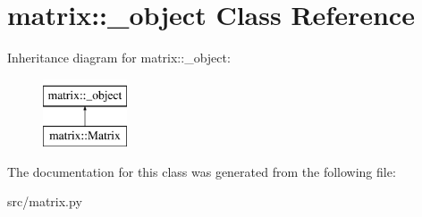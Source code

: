 \hypertarget{classmatrix_1_1__object}{
\section{matrix::\_\-object Class Reference}
\label{d8/ddb/classmatrix_1_1__object}
}
Inheritance diagram for matrix::\_\-object:\begin{figure}[H]
\begin{center}
\leavevmode
\includegraphics[height=2cm]{d8/ddb/classmatrix_1_1__object}
\end{center}
\end{figure}


The documentation for this class was generated from the following file:\begin{DoxyCompactItemize}
\item 
src/matrix.py\end{DoxyCompactItemize}
